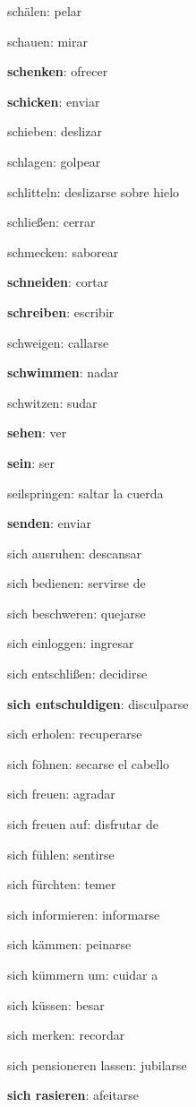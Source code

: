 \begin{multicols}{2}
\begin{myitemize}
\item schälen: pelar 
\item schauen: mirar
\item \textbf{schenken}: ofrecer
\item \textbf{schicken}: enviar
\item schieben: deslizar
\item schlagen: golpear
\item schlitteln: deslizarse sobre hielo
\item schließen: cerrar
\item schmecken: saborear
\item \textbf{schneiden}: cortar
\item \textbf{schreiben}: escribir
\item schweigen: callarse
\item \textbf{schwimmen}: nadar
\item schwitzen: sudar
\item \textbf{sehen}: ver
\item \textbf{sein}: ser
\item seilspringen: saltar la cuerda
\item \textbf{senden}: enviar
\item sich ausruhen: descansar
\item sich bedienen: servirse de
\item sich beschweren: quejarse
\item sich einloggen: ingresar
\item sich entschlißen: decidirse
\item \textbf{sich entschuldigen}: disculparse
\item sich erholen: recuperarse
\item sich föhnen: secarse el cabello
\item sich freuen: agradar
\item sich freuen auf: disfrutar de
\item sich fühlen: sentirse
\item sich fürchten: temer
\item sich informieren: informarse
\item sich kämmen: peinarse
\item sich kümmern um: cuidar a
\item sich küssen: besar
\item sich merken: recordar
\item sich pensioneren lassen: jubilarse
\item \textbf{sich rasieren}: afeitarse

\end{myitemize}
\end{multicols}
